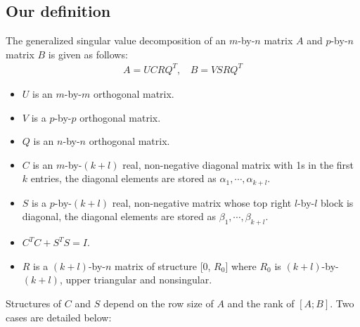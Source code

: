 \subsection{Our definition} \label{def}
    The generalized singular value decomposition of an $m$-by-$n$ matrix $A$ and $p$-by-$n$ matrix $B$ is given as follows:
        \begin{align} \label{eq-def}
            A = UCRQ^T,\ \  \ \ B = VSRQ^T
        \end{align}

        \begin{itemize}
            \item $U$ is an $m$-by-$m$ orthogonal matrix.
            \item $V$ is a $p$-by-$p$ orthogonal matrix.
            \item $Q$ is an $n$-by-$n$ orthogonal matrix. 
            \item $C$ is an $m$-by-$(k+l)$ real, non-negative diagonal matrix with 1s in the first $k$ entries, the diagonal elements are stored as $\alpha_1, \cdots, \alpha_{k+l}$.
            \item $S$ is a $p$-by-$(k+l)$ real, non-negative matrix whose top right $l$-by-$l$ block is diagonal, the diagonal elements are stored as $\beta_1, \cdots, \beta_{k+l}$.
            \item $C^T C + S^T S = I$.
            \item $R$ is a $(k+l)$-by-$n$ matrix of structure [0, $R_0$] where $R_0$ is $(k+l)$-by-$(k+l)$, upper triangular and nonsingular. 
        \end{itemize}
        
        Structures of $C$ and $S$ depend on the row size of $A$ and the rank of $[A; B]$. Two cases are detailed below:
        
